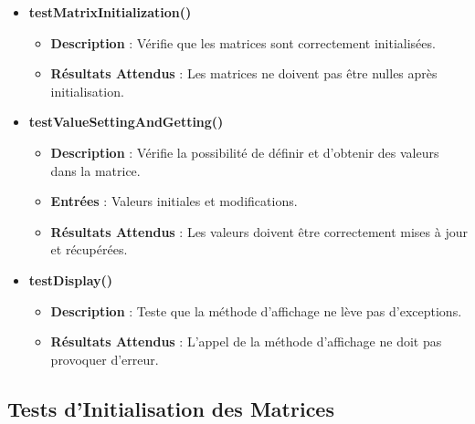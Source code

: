 \documentclass[12pt, a4paper, onecolumn]{article}
\begin{document}
\begin{itemize}
		\item \textbf{testMatrixInitialization()}
		\begin{itemize}
			\item \textbf{Description} : Vérifie que les matrices sont correctement initialisées.
			\item \textbf{Résultats Attendus} : Les matrices ne doivent pas être nulles après initialisation.
		\end{itemize}
		
		\item \textbf{testValueSettingAndGetting()}
		\begin{itemize}
			\item \textbf{Description} : Vérifie la possibilité de définir et d'obtenir des valeurs dans la matrice.
			\item \textbf{Entrées} : Valeurs initiales et modifications.
			\item \textbf{Résultats Attendus} : Les valeurs doivent être correctement mises à jour et récupérées.
		\end{itemize}
		
		\item \textbf{testDisplay()}
		\begin{itemize}
			\item \textbf{Description} : Teste que la méthode d'affichage ne lève pas d'exceptions.
			\item \textbf{Résultats Attendus} : L'appel de la méthode d'affichage ne doit pas provoquer d'erreur.
		\end{itemize}
	\end{itemize}
		\newpage
	\subsection{Tests d'Initialisation des Matrices}
	
\end{document}
